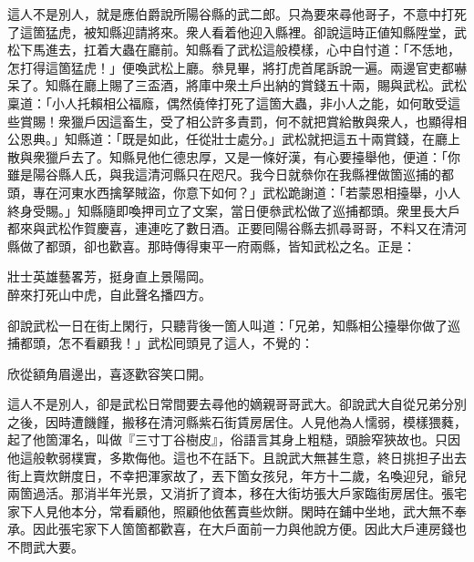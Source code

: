 這人不是別人，就是應伯爵說所陽谷縣的武二郎。只為要來尋他哥子，不意中打死了這箇猛虎，被知縣迎請將來。衆人看着他迎入縣裡。卻說這時正値知縣陞堂，武松下馬進去，扛着大蟲在廳前。知縣看了武松這般模樣，心中自忖道：「不恁地，怎打得這箇猛虎！」便喚武松上廳。叅見畢，將打虎首尾訴說一遍。兩邊官吏都嚇呆了。知縣在廳上賜了三盃酒，將庫中衆土戶出納的賞錢五十兩，賜與武松。武松稟道：「小人托賴相公福廕，偶然僥倖打死了這箇大蟲，非小人之能，如何敢受這些賞賜！衆獵戶因這畜生，受了相公許多責罰，何不就把賞給散與衆人，也顯得相公恩典。」{}知縣道：「既是如此，任從壯士處分。」武松就把這五十兩賞錢，在廳上散與衆獵戶去了。知縣見他仁德忠厚，又是一條好漢，有心要擡舉他，便道：「你雖是陽谷縣人氏，與我這清河縣只在咫尺。我今日就叅你在我縣裡做箇巡捕的都頭，專在河東水西擒拏賊盜，你意下如何？」武松跪謝道：「若蒙恩相擡舉，小人終身受賜。」知縣隨即喚押司立了文案，當日便叅武松做了巡捕都頭。衆里長大戶都來與武松作賀慶喜，連連吃了數日酒。正要囘陽谷縣去抓尋哥哥，不料又在清河縣做了都頭，卻也歡喜。那時傳得東平一府兩縣，皆知武松之名。正是：

\begin{myquote}
壯士英雄藝畧芳，挺身直上景陽岡。\\
醉來打死山中虎，自此聲名播四方。
\end{myquote}

卻說武松一日在街上閑行，只聽背後一箇人叫道：「兄弟，知縣相公擡舉你做了巡捕都頭，怎不看顧我！」武松囘頭見了這人，不覺的：

\begin{myquote}
欣從額角眉邊出，喜逐歡容笑口開。
\end{myquote}

這人不是別人，卻是武松日常間要去尋他的嫡親哥哥武大。卻說武大自從兄弟分別之後，因時遭饑饉，搬移在清河縣紫石街賃房居住。人見他為人懦弱，模樣猥蕤，起了他箇渾名，叫做『三寸丁谷樹皮』，{}俗語言其身上粗糙，頭臉窄狹故也。只因他這般軟弱樸實，多欺侮他。這也不在話下。且說武大無甚生意，終日挑担子出去街上賣炊餅度日，不幸把渾家故了，丟下箇女孩兒，年方十二歲，名喚迎兒，爺兒兩箇過活。那消半年光景，又消折了資本，移在大街坊張大戶家臨街房居住。張宅家下人見他本分，常看顧他，照顧他依舊賣些炊餅。閑時在鋪中坐地，武大無不奉承。因此張宅家下人箇箇都歡喜，在大戶面前一力與他說方便。因此大戶連房錢也不問武大要。

